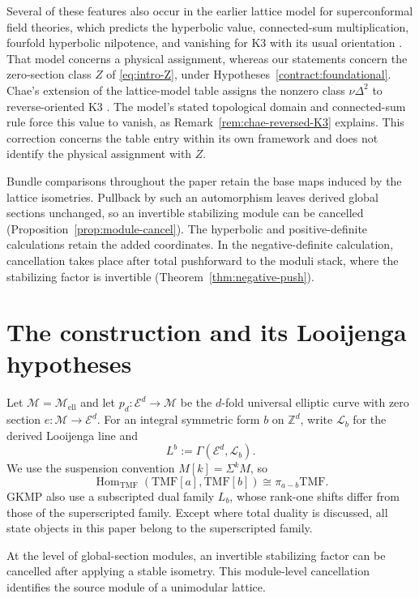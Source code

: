 \documentclass[11pt,a4paper]{amsart}
\newcommand{\Z}{\mathbb Z}
\newcommand{\TMF}{\mathrm{TMF}}
\newcommand{\cM}{\mathcal M}
\newcommand{\cE}{\mathcal E}
\newcommand{\cL}{\mathcal L}
\newcommand{\Hom}{\operatorname{Hom}}
\theoremstyle{plain}
\theoremstyle{definition}
\theoremstyle{remark}
\begin{document}
Several of these features also occur in the earlier lattice model
for superconformal field theories, which predicts the hyperbolic
value, connected-sum multiplication, fourfold hyperbolic nilpotence,
and vanishing for K3 with its usual orientation
\cite[Section~2.7]{GPPV}. That model concerns a physical assignment,
whereas our statements concern the zero-section class $Z$ of
\eqref{eq:intro-Z}, under Hypotheses~\ref{contract:foundational}.
Chae's extension of the lattice-model table assigns the nonzero
class $\nu\Delta^2$ to reverse-oriented K3
\cite[Section~2, Table~1]{Chae}. The model's stated topological
domain and connected-sum rule force this value to vanish, as
Remark~\ref{rem:chae-reversed-K3} explains. This correction concerns
the table entry within its own framework and does not identify
the physical assignment with $Z$.

Bundle comparisons throughout the paper retain the base maps induced
by the lattice isometries. Pullback by such an automorphism leaves
derived global sections unchanged, so an invertible stabilizing
module can be cancelled (Proposition~\ref{prop:module-cancel}).
The hyperbolic and positive-definite calculations retain the added
coordinates. In the negative-definite calculation, cancellation
takes place after total pushforward to the moduli stack, where the
stabilizing factor is invertible (Theorem~\ref{thm:negative-push}).

\section{The construction and its Looijenga hypotheses}\label{sec:contract}

Let $\cM=\mathcal M_{\mathrm{ell}}$ and let
$p_d:\cE^d\to\cM$ be the $d$-fold universal elliptic curve
with zero section $e:\cM\to\cE^d$. For an integral symmetric
form $b$ on $\Z^d$, write $\cL_b$ for the derived Looijenga
line and
\[
 L^b:=\Gamma(\cE^d,\cL_b).
\]
We use the suspension convention $M[k]=\Sigma^kM$, so
\begin{equation}\label{eq:Hom-convention}
 \Hom_{\TMF}(\TMF[a],\TMF[b])\cong\pi_{a-b}\TMF.
\end{equation}
GKMP also use a subscripted dual family $L_b$, whose rank-one
shifts differ from those of the superscripted family. Except where
total duality is discussed, all state objects in this paper belong
to the superscripted family.

At the level of global-section modules, an invertible stabilizing
factor can be cancelled after applying a stable isometry. This
module-level cancellation identifies the source module of a
unimodular lattice.
\end{document}
